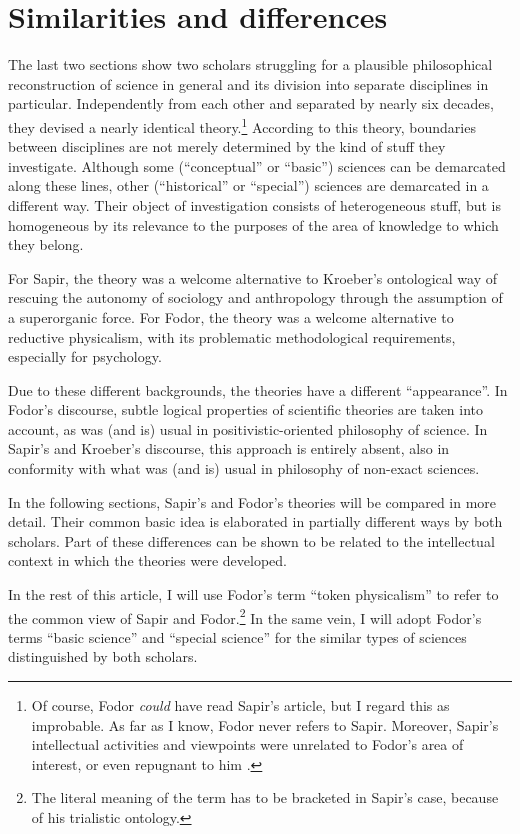 \documentclass[output=paper]{langscibook}
\begin{document}
\section{Similarities and differences}
\label{sec:elffers:similaritiesdiffs}
The last two sections show two scholars struggling for a plausible philosophical reconstruction of science in general and its division into separate disciplines in particular. Independently from each other and separated by nearly six decades, they devised a nearly identical theory.\footnote{Of course, Fodor \emph{could} have read Sapir's article, but I regard this as improbable. As far as I know, Fodor never refers to Sapir. Moreover, Sapir's intellectual activities and viewpoints were unrelated to Fodor's area of interest, or even repugnant to him \citep[cf.][]{Pullum2017}.} According to this theory, boundaries between disciplines are not merely determined by the kind of stuff they investigate. Although some (``conceptual'' or ``basic'') sciences can be demarcated along these lines, other (``historical'' or ``special'') sciences are demarcated in a different way. Their object of investigation consists of heterogeneous stuff, but is homogeneous by its relevance to the purposes of the area of knowledge to which they belong.

For Sapir, the theory was a welcome alternative to Kroeber's ontological way of rescuing the autonomy of sociology and anthropology through the assumption of a superorganic force. For Fodor, the theory was a welcome alternative to reductive physicalism, with its problematic methodological requirements, especially for psychology.

Due to these different backgrounds, the theories have a different ``appearance''. In Fodor's discourse, subtle logical properties of scientific theories are taken into account, as was (and is) usual in positivistic-oriented philosophy of science. In Sapir's and Kroeber's discourse, this approach is entirely absent, also in conformity with what was (and is) usual in philosophy of non-exact sciences.

In the following sections, Sapir's and Fodor's theories will be compared in more detail. Their common basic idea is elaborated in partially different ways by both scholars. Part of these differences can be shown to be related to the intellectual context in which the theories were developed.

In the rest of this article, I will use Fodor's term ``token physicalism'' to refer to the common view of Sapir and Fodor.\footnote{The literal meaning of the term has to be bracketed in Sapir's case, because of his trialistic ontology.} In the same vein, I will adopt Fodor's terms ``basic science'' and ``special science'' for the similar types of sciences distinguished by both scholars.
\end{document}
